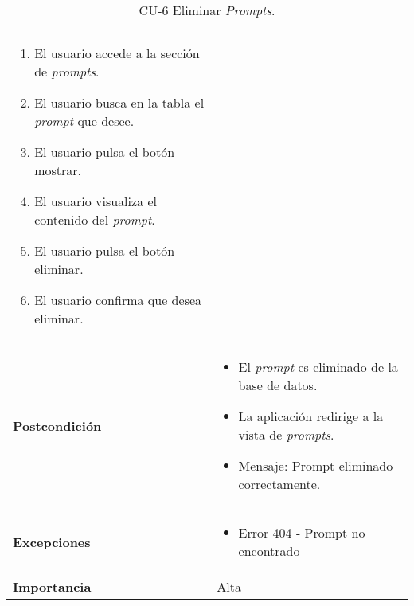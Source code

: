 \begin{table}[p]
\begin{tabularx}{\linewidth}{ p{} p{} }
\begin{enumerate}
\begin{enumerate}
                            			\def\labelenumi{\arabic{enumi}.}
                            			\tightlist
                            			\item El usuario accede a la sección de \textit{prompts}.
                                        \item El usuario busca en la tabla el \textit{prompt} que desee.
                            			\item El usuario pulsa el botón mostrar.
                                        \item El usuario visualiza el contenido del \textit{prompt}.
                                        \item El usuario pulsa el botón eliminar.
                                        \item El usuario confirma que desea eliminar.
                                    \end{enumerate}
                            		\end{enumerate} \\
		\textbf{Postcondición}        
                                & 
                                \begin{itemize} 
                                    \tightlist
                                    \item El \textit{prompt} es eliminado de la base de datos.
                                    \item La aplicación redirige a la vista de \textit{prompts}.
                                    \item Mensaje: Prompt eliminado correctamente.
                                \end{itemize}  
                                \\ 
		\textbf{Excepciones}          
                                    & 
                                        \begin{itemize}
                                        \tightlist
                                            \item Error 404 - Prompt no encontrado
                                        \end{itemize}  
                                        \\ 
		\textbf{Importancia}          & Alta \\
		\bottomrule
	\end{tabularx}
	\caption{CU-6 Eliminar \textit{Prompts}.}
	\label{tab:CU-6}
\end{table}


